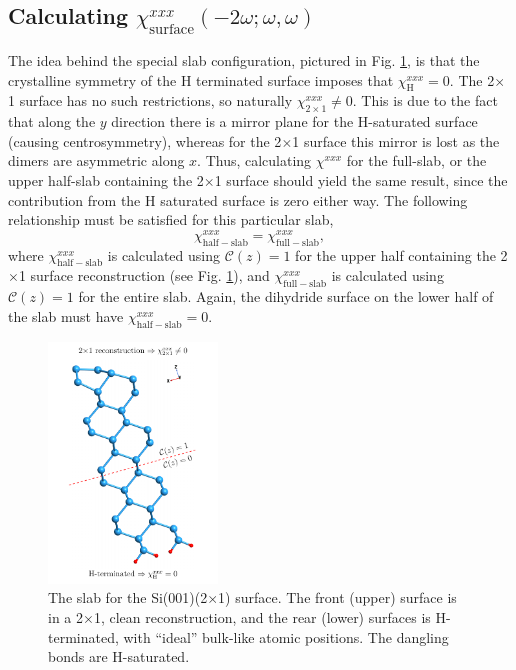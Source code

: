 
\subsection{Calculating 
\texorpdfstring{$\chi^{xxx}_{\mathrm{surface}}(-2\omega;\omega,\omega)$}{Xxxx}}
\label{sec:res2x1chi}

The idea behind the special slab configuration, pictured in Fig.
\ref{fig:si2x1slab}, is that the crystalline symmetry of the H terminated
surface imposes that $\chi_{\mathrm{H}}^{xxx}=0$. The 2$\times$1 surface has no
such restrictions, so naturally $\chi_{2\times 1}^{xxx}\ne 0$. This is due to
the fact that along the $y$ direction there is a mirror plane for the
H-saturated surface (causing centrosymmetry), whereas for the 2$\times$1 surface
this mirror is lost as the dimers are asymmetric along $x$. Thus, calculating
$\chi^{xxx}$ for the full-slab, or the upper half-slab containing the 2$\times$1
surface \cite{note1} should yield the same result, since the contribution from
the H saturated surface is zero either way. The following relationship must be
satisfied for this particular slab,
\begin{equation*}
\chi_{\mathrm{half-slab}}^{xxx} =
\chi_{\mathrm{full-slab}}^{xxx},
\end{equation*}
where $\chi_{\mathrm{half-slab}}^{xxx}$ is calculated using
${\mathbf{\mathcal{C}}}(z) = 1$ for the upper half containing the 2$\times$1
surface reconstruction (see Fig. \ref{fig:si2x1slab}), and
$\chi_{\mathrm{full-slab}}^{xxx}$ is calculated using ${\mathbf{\mathcal{C}}}(z)
= 1$ for the entire slab. Again, the dihydride surface on the lower half of the
slab must have $\chi_{\mathrm{half-slab}}^{xxx} = 0$.

\begin{figure}[h]
\centering 
\includegraphics[width=0.4\textwidth]{content/figures/struc-Si2x1-rot}
\caption{The slab for the Si(001)(2$\times$1) surface. The front (upper) surface
is in a 2$\times$1, clean reconstruction, and the rear (lower) surfaces is
H-terminated, with ``ideal'' bulk-like atomic positions. The dangling bonds are
H-saturated.}
\label{fig:si2x1slab}
\end{figure} 


